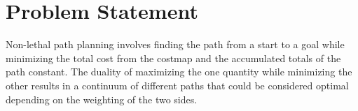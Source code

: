 \section{Problem Statement}

Non-lethal path planning involves finding the path from a start to a goal while minimizing the total cost from the costmap and the accumulated totals of the path constant. The duality of maximizing the one quantity while minimizing the other results in a continuum of different paths that could be considered optimal depending on the weighting of the two sides. 




